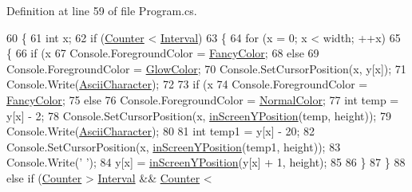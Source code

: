 Definition at line 59 of file Program.\-cs.


\begin{DoxyCode}
60         \{
61             \textcolor{keywordtype}{int} x;
62             \textcolor{keywordflow}{if} (\hyperlink{classmatrix_1_1_program_a7ebfe2b7ace6afb02108a7d38abb6f1b}{Counter} < \hyperlink{classmatrix_1_1_program_a6c872786668501a3f17cddb985c7ade0}{Interval})
63             \{
64                 \textcolor{keywordflow}{for} (x = 0; x < width; ++x)
65                 \{
66                     \textcolor{keywordflow}{if} (x %
67                         Console.ForegroundColor = \hyperlink{classmatrix_1_1_program_a20f58f721e0c5cdf3b4f519bb7ef872a}{FancyColor};
68                     \textcolor{keywordflow}{else}
69                         Console.ForegroundColor = \hyperlink{classmatrix_1_1_program_ae5ddcc0d3f98613073560fa4e3d66f5b}{GlowColor};
70                     Console.SetCursorPosition(x, y[x]);
71                     Console.Write(\hyperlink{classmatrix_1_1_program_ae4f0df2b9f302e657820ea236f831664}{AsciiCharacter});
72 
73                     \textcolor{keywordflow}{if} (x %
74                         Console.ForegroundColor = \hyperlink{classmatrix_1_1_program_a20f58f721e0c5cdf3b4f519bb7ef872a}{FancyColor};
75                     \textcolor{keywordflow}{else}
76                         Console.ForegroundColor = \hyperlink{classmatrix_1_1_program_ab208e57b1469c5728605ac04b0eae86c}{NormalColor};
77                     \textcolor{keywordtype}{int} temp = y[x] - 2;
78                     Console.SetCursorPosition(x, \hyperlink{classmatrix_1_1_program_ae800bb3943994a4c6d5595fcb01370c5}{inScreenYPosition}(temp, height));
79                     Console.Write(\hyperlink{classmatrix_1_1_program_ae4f0df2b9f302e657820ea236f831664}{AsciiCharacter});
80 
81                     \textcolor{keywordtype}{int} temp1 = y[x] - 20;
82                     Console.SetCursorPosition(x, \hyperlink{classmatrix_1_1_program_ae800bb3943994a4c6d5595fcb01370c5}{inScreenYPosition}(temp1, height));
83                     Console.Write(\textcolor{charliteral}{' '});
84                     y[x] = \hyperlink{classmatrix_1_1_program_ae800bb3943994a4c6d5595fcb01370c5}{inScreenYPosition}(y[x] + 1, height);
85 
86                 \}
87             \}
88             \textcolor{keywordflow}{else} \textcolor{keywordflow}{if} (\hyperlink{classmatrix_1_1_program_a7ebfe2b7ace6afb02108a7d38abb6f1b}{Counter} > \hyperlink{classmatrix_1_1_program_a6c872786668501a3f17cddb985c7ade0}{Interval} && \hyperlink{classmatrix_1_1_program_a7ebfe2b7ace6afb02108a7d38abb6f1b}{Counter} < 

\end{DoxyCode}
